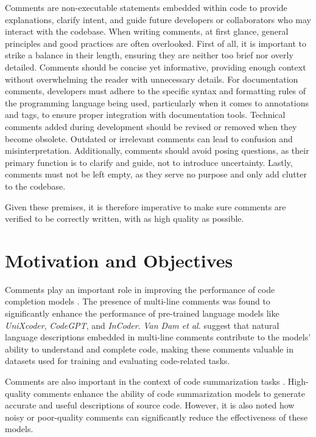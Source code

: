 \noindent Comments are non-executable statements embedded within code to provide explanations, clarify intent, and guide future developers or collaborators who may interact with the codebase.
When writing comments, at first glance, general principles and good practices \cite{commentingPrinciples} are often overlooked. First of all, it is important to strike a balance in their length, ensuring they are neither too brief nor overly detailed. Comments should be concise yet informative, providing enough context without overwhelming the reader with unnecessary details.
For documentation comments, developers must adhere to the specific syntax and formatting rules of the programming language being used, particularly when it comes to annotations and tags, to ensure proper integration with documentation tools.
Technical comments added during development should be revised or removed when they become obsolete. Outdated or irrelevant comments can lead to confusion and misinterpretation.
Additionally, comments should avoid posing questions, as their primary function is to clarify and guide, not to introduce uncertainty. Lastly, comments must not be left empty, as they serve no purpose and only add clutter to the codebase.

\noindent Given these premises, it is therefore imperative to make sure comments are verified to be correctly written, with as high quality as possible.


\section{Motivation and Objectives}
Comments play an important role in improving the performance of code completion models \cite{vandam2023}.
The presence of multi-line comments was found to significantly enhance the performance of pre-trained language models like \textit{UniXcoder}, \textit{CodeGPT}, and \textit{InCoder}. \textit{Van Dam et al.} suggest that natural language descriptions embedded in multi-line comments contribute to the models' ability to understand and complete code, making these comments valuable in datasets used for training and evaluating code-related tasks.

\noindent Comments are also important in the context of code summarization tasks \cite{buildingRock}.
High-quality comments enhance the ability of code summarization models to generate accurate and useful descriptions of source code. However, it is also noted how noisy or poor-quality comments can significantly reduce the effectiveness of these models.

